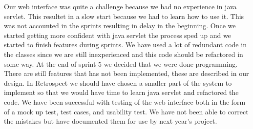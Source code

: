 Our web interface was quite a challenge because we had no experience in java servlet. This resultet in a slow start because we had to learn how to use it. This was not accounted in the sprints resulting in delay in the beginning. Once we started getting more confident with java servlet the process sped up and we started to finish features during sprints. We have used a lot of redundant code in the classes since we are still inexperienced and this code should be refactored in some way. At the end of sprint 5 we decided that we were done programming. There are still features that has not been implemented, these are described in our design. In Retrospect we should have chosen a smaller part of the system to implement so that we would have time to learn java servlet and refactored the code. We have been successful with testing of the web interface both in the form of a mock up test, test cases, and usability test. We have not been able to correct the mistakes but have documented them for use by next year's project.

 